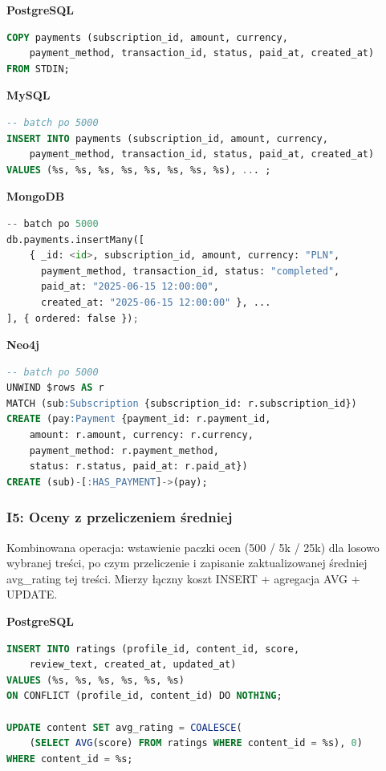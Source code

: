\textbf{PostgreSQL}
\begin{lstlisting}[language=SQL]
COPY payments (subscription_id, amount, currency,
    payment_method, transaction_id, status, paid_at, created_at)
FROM STDIN;
\end{lstlisting}

\textbf{MySQL}
\begin{lstlisting}[language=SQL]
-- batch po 5000
INSERT INTO payments (subscription_id, amount, currency,
    payment_method, transaction_id, status, paid_at, created_at)
VALUES (%s, %s, %s, %s, %s, %s, %s, %s), ... ;
\end{lstlisting}

\textbf{MongoDB}
\begin{lstlisting}[language=Python]
-- batch po 5000
db.payments.insertMany([
    { _id: <id>, subscription_id, amount, currency: "PLN",
      payment_method, transaction_id, status: "completed",
      paid_at: "2025-06-15 12:00:00",
      created_at: "2025-06-15 12:00:00" }, ...
], { ordered: false });
\end{lstlisting}

\textbf{Neo4j}
\begin{lstlisting}[language=SQL]
-- batch po 5000
UNWIND $rows AS r
MATCH (sub:Subscription {subscription_id: r.subscription_id})
CREATE (pay:Payment {payment_id: r.payment_id,
    amount: r.amount, currency: r.currency,
    payment_method: r.payment_method,
    status: r.status, paid_at: r.paid_at})
CREATE (sub)-[:HAS_PAYMENT]->(pay);
\end{lstlisting}


\subsubsection{I5: Oceny z przeliczeniem średniej}

Kombinowana operacja: wstawienie paczki ocen (500 / 5k / 25k) dla losowo
wybranej treści, po czym przeliczenie i zapisanie zaktualizowanej średniej
avg\_rating tej treści. Mierzy łączny koszt INSERT + agregacja AVG + UPDATE.

\textbf{PostgreSQL}
\begin{lstlisting}[language=SQL]
INSERT INTO ratings (profile_id, content_id, score,
    review_text, created_at, updated_at)
VALUES (%s, %s, %s, %s, %s, %s)
ON CONFLICT (profile_id, content_id) DO NOTHING;

UPDATE content SET avg_rating = COALESCE(
    (SELECT AVG(score) FROM ratings WHERE content_id = %s), 0)
WHERE content_id = %s;
\end{lstlisting}

